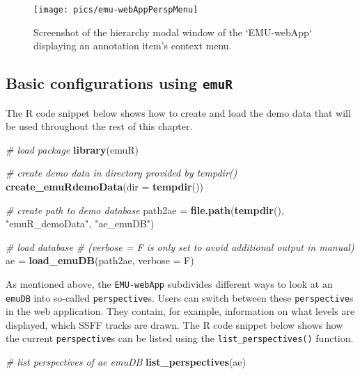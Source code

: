 \documentclass[]{book}
\newenvironment{Shaded}{\begin{snugshade}}{\end{snugshade}}
\newcommand{\CommentTok}[1]{\textcolor[rgb]{0.56,0.35,0.01}{\textit{#1}}}
\newcommand{\DataTypeTok}[1]{\textcolor[rgb]{0.13,0.29,0.53}{#1}}
\newcommand{\KeywordTok}[1]{\textcolor[rgb]{0.13,0.29,0.53}{\textbf{#1}}}
\newcommand{\NormalTok}[1]{#1}
\newcommand{\StringTok}[1]{\textcolor[rgb]{0.31,0.60,0.02}{#1}}
\begin{document}
\begin{figure}

{\centering \texttt{[image: pics/emu-webAppPerspMenu]} 

}

\caption{Screenshot of the hierarchy modal window of the `EMU-webApp` displaying an annotation item's context menu.}\label{fig:webApp-perspMenu}
\end{figure}

\hypertarget{subsec:emu-webAppConfigWithEmuR}{%
\subsection{\texorpdfstring{Basic configurations using \texttt{emuR}}{Basic configurations using emuR}}\label{subsec:emu-webAppConfigWithEmuR}}

The R code snippet below shows how to create and load the demo data that will be used throughout the rest of this chapter.

\begin{Shaded}
\begin{Highlighting}[]
\CommentTok{# load package}
\KeywordTok{library}\NormalTok{(emuR)}

\CommentTok{# create demo data in directory provided by tempdir()}
\KeywordTok{create_emuRdemoData}\NormalTok{(}\DataTypeTok{dir =} \KeywordTok{tempdir}\NormalTok{())}

\CommentTok{# create path to demo database}
\NormalTok{path2ae =}\StringTok{ }\KeywordTok{file.path}\NormalTok{(}\KeywordTok{tempdir}\NormalTok{(), }\StringTok{"emuR_demoData"}\NormalTok{, }\StringTok{"ae_emuDB"}\NormalTok{)}

\CommentTok{# load database}
\CommentTok{# (verbose = F is only set to avoid additional output in manual)}
\NormalTok{ae =}\StringTok{ }\KeywordTok{load_emuDB}\NormalTok{(path2ae, }\DataTypeTok{verbose =}\NormalTok{ F)}
\end{Highlighting}
\end{Shaded}

As mentioned above, the \texttt{EMU-webApp} subdivides different ways to look at an \texttt{emuDB} into so-called \texttt{perspective}s. Users can switch between these \texttt{perspective}s in the web application. They contain, for example, information on what levels are displayed, which SSFF tracks are drawn. The R code snippet below shows how the current \texttt{perspective}s can be listed using the \texttt{list\_perspectives()} function.

\begin{Shaded}
\begin{Highlighting}[]
\CommentTok{# list perspectives of ae emuDB}
\KeywordTok{list_perspectives}\NormalTok{(ae)}
\end{Highlighting}
\end{Shaded}
\end{document}
